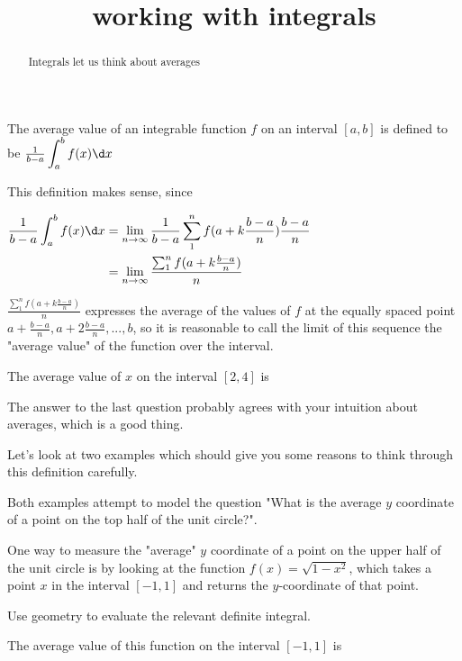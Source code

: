 \documentclass{ximera}
\title{working with integrals}
\begin{document}
\begin{abstract}
	Integrals let us think about averages
\end{abstract}

\maketitle

\begin{definition}
	The average value of an integrable function $f$ on an interval $[a,b]$ is defined to be $\frac{1}{b-a} \displaystyle\int_a^b f(x) \d x$
\end{definition}

This definition makes sense, since 

$\begin{align*}
\frac{1}{b-a} \displaystyle\int_a^b f(x) \d x &= \lim_{n \to \infty} \frac{1}{b-a} \sum_1^n f(a+k \frac{b-a}{n})\frac{b-a}{n}\\
&= \lim_{n \to \infty} \frac{\sum_1^n f(a+k \frac{b-a}{n})}{n}\\
\end{align*}$

$\frac{\sum_1^n f(a+k \frac{b-a}{n})}{n}$ expresses the average of the values of $f$ at the equally spaced point $a + \frac{b-a}{n}, a+2\frac{b-a}{n}, ..., b$, so it is reasonable to call the limit of this sequence the "average value" of the function over the interval.

\begin{question}
	The average value of $x$ on the interval $[2,4]$ is 
\end{question}

The answer to the last question probably agrees with your intuition about averages, which is a good thing.

Let's look at two examples which should give you some reasons to think through this definition carefully.

Both examples attempt to model the question "What is the average $y$ coordinate of a point on the top half of the unit circle?".

\begin{question}
	
	One way to measure the "average" $y$ coordinate of a point on the upper half of the unit circle is by looking at the function $f(x) = \sqrt{1-x^2}$, which takes a point $x$ in the interval $[-1,1]$ and returns the $y$-coordinate of that point.
	\begin{hint}
		Use geometry to evaluate the relevant definite integral.
	\end{hint}
	
	The average value of this function on the interval $[-1,1]$ is 
\end{question}
\end{document}

